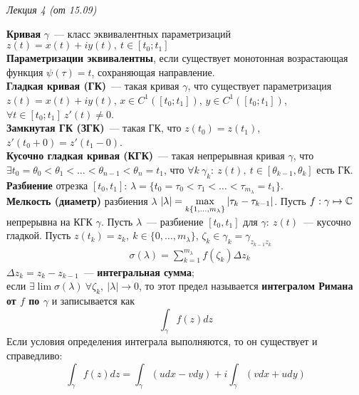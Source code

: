 \begin{flushright}
    \textit{Лекция 4 (от 15.09)}
\end{flushright}

\textbf{Кривая} $\gamma$~--- класс эквивалентных параметризаций $z(t) = x(t) +
iy(t), \ t \in \left[ t_0; t_1 \right]$
\\
\textbf{Параметризации эквивалентны}, если существует монотонная возрастающая
функция $\psi(\tau) = t$, сохраняющая направление.
\\
\textbf{Гладкая кривая (ГК)}~--- такая кривая $\gamma$, что существует параметризация
$z(t) = x(t) + iy(t)$, $x \in C^1 \left( \left[ t_0; t_1 \right] \right)$, $y
\in C^1 \left( \left[ t_0; t_1 \right] \right)$, $\forall t \in \left[ t_0; t_1
\right] \ z'(t) \neq 0$.
\\
\textbf{Замкнутая ГК (ЗГК)}~--- такая ГК, что $z(t_0) = z(t_1)$, $z'(t_0+0) =
z'(t_1-0)$.
\\
\textbf{Кусочно гладкая кривая (КГК)}~--- такая непрерывная кривая $\gamma$, что
$\exists t_0 = \theta_0 < \theta_1 < \dots < \theta_{n-1} < \theta_n = t_1$, что
$\forall k \ \gamma_k: \ z(t), \ t \in [\theta_{k-1}, \theta_k]$ есть ГК.
\\
\textbf{Разбиение} отрезка $\left[ t_0, t_1 \right]$: $\lambda = \{t_0 = \tau_0
< \tau_1 < \dots < \tau_{m_\lambda} = t_1\}$.
\\
\textbf{Мелкость (диаметр)} разбиения $\lambda$ $\left| \lambda \right| = \displaystyle
\max_{k \{1, \dots, m_\lambda\}}\left| \tau_k - \tau_{k-1} \right|$.
\Def Пусть $f: \gamma \mapsto \mathbb{C}$ непрерывна на КГК $\gamma$. Пусть
$\lambda$~--- разбиение $\left[ t_0, t_1 \right]$ для $\gamma: \ z(t)$~---
кусочно гладкой. Пусть $z(t_k) = z_k, \ k \in \{0, \dots, m_\lambda\}$, $\zeta_k
\in \gamma_k = \gamma_{z_{k-1}z_k}$
\begin{align*}
  & \sigma(\lambda) = \sum_{k = 1}^{m_{\lambda}} f(\zeta_k) \Delta z_k
\end{align*}
$\Delta z_k = z_k - z_{k-1}$~--- \textbf{интегральная сумма};
\\
если $\exists \lim \sigma(\lambda) \ \forall \zeta_k, \ \left| \lambda \right|
\to 0$, то этот предел называется \textbf{интегралом Римана от $f$ по $\gamma$}
и записывается как
\begin{equation} \label{(6.1)}
    \int_{\gamma}f(z) dz
\end{equation}
\theorem
Если условия определения интеграла выполняются, то он существует и справедливо:
\begin{equation} \label{(6.2)}
    \int_{\gamma}f(z)dz = \int_{\gamma}\left( u dx - v dy \right) + i \int_\gamma \left( v dx + u dy \right)
\end{equation}

